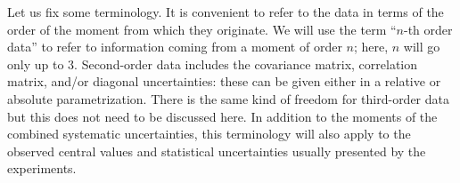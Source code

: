 \documentclass[11pt]{article}
\begin{document}


Let us fix some terminology.  It is convenient to refer to the data in terms of
the order of the moment from which they originate. We will use the term ``$n$-th
order data'' to refer to information coming from a moment of order $n$; here, $n$
will go only up to $3$. Second-order data includes the covariance matrix,
correlation matrix, and/or diagonal uncertainties: these can be given either in a
relative or absolute parametrization. There is the same kind of freedom for
third-order data but this does not need to be discussed here. In addition to the
moments of the combined systematic uncertainties, this terminology will also
apply to the observed central values and statistical uncertainties usually
presented by the experiments.


%
%
%
%
\end{document}
